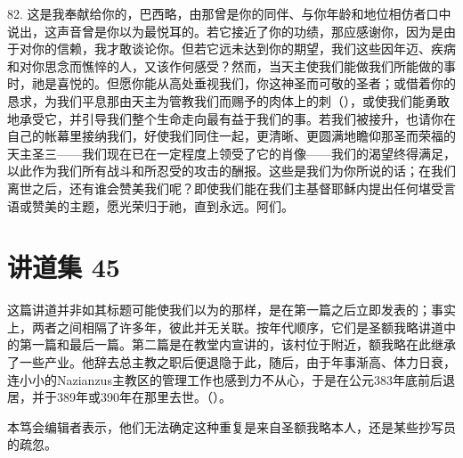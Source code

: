 82. 这是我奉献给你的，巴西略，由那曾是你的同伴、与你年龄和地位相仿者口中说出，这声音曾是你以为最悦耳的。若它接近了你的功绩，那应感谢你，因为是由于对你的信赖，我才敢谈论你。但若它远未达到你的期望，我们这些因年迈、疾病和对你思念而憔悴的人，又该作何感受？然而，当天主使我们能做我们所能做的事时，祂是喜悦的。但愿你能从高处垂视我们，你这神圣而可敬的圣者；或借着你的恳求，为我们平息那由天主为管教我们而赐予的肉体上的刺（），或使我们能勇敢地承受它，并引导我们整个生命走向最有益于我们的事。若我们被接升，也请你在自己的帐幕里接纳我们，好使我们同住一起，更清晰、更圆满地瞻仰那圣而荣福的天主圣三——我们现在已在一定程度上领受了它的肖像——我们的渴望终得满足，以此作为我们所有战斗和所忍受的攻击的酬报。这些是我们为你所说的话；在我们离世之后，还有谁会赞美我们呢？即使我们能在我们主基督耶稣内提出任何堪受言语或赞美的主题，愿光荣归于祂，直到永远。阿们。\par



\section{讲道集 45}

\par

这篇讲道并非如其标题可能使我们以为的那样，是在第一篇之后立即发表的；事实上，两者之间相隔了许多年，彼此并无关联。按年代顺序，它们是圣额我略讲道中的第一篇和最后一篇。第二篇是在教堂内宣讲的，该村位于附近，额我略在此继承了一些产业。他辞去总主教之职后便退隐于此，随后，由于年事渐高、体力日衰，连小小的Nazianzus主教区的管理工作也感到力不从心，于是在公元383年底前后退居，并于389年或390年在那里去世。（）。\par

本笃会编辑者表示，他们无法确定这种重复是来自圣额我略本人，还是某些抄写员的疏忽。\par

